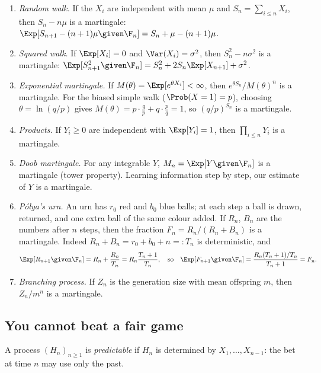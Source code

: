 \begin{example}\label{ex:martingales}
\begin{enumerate}[label=(\arabic*)]
\item \emph{Random walk.} If the $X_i$ are independent with mean $\mu$ and $S_n=\sum_{i\le n}X_i$,
then $S_n-n\mu$ is a martingale: $\Exp[S_{n+1}-(n+1)\mu\given\F_n]=S_n+\mu-(n+1)\mu$.
\item \emph{Squared walk.} If $\Exp[X_i]=0$ and $\Var(X_i)=\sigma^2$, then $S_n^2-n\sigma^2$
is a martingale: $\Exp[S_{n+1}^2\given\F_n]=S_n^2+2S_n\Exp[X_{n+1}]+\sigma^2$.
\item \emph{Exponential martingale.} If $M(\theta)=\Exp[e^{\theta X_i}]<\infty$, then
$e^{\theta S_n}/M(\theta)^n$ is a martingale. For the biased simple walk
($\Prob(X=1)=p$), choosing $\theta=\ln(q/p)$ gives $M(\theta)=p\cdot\frac qp+q\cdot\frac pq=1$,
so $(q/p)^{S_n}$ is a martingale.
\item \emph{Products.} If $Y_i\ge0$ are independent with $\Exp[Y_i]=1$, then
$\prod_{i\le n}Y_i$ is a martingale.
\item \emph{Doob martingale.} For any integrable $Y$, $M_n=\Exp[Y\given\F_n]$ is a martingale
(tower property). Learning information step by step, our estimate of $Y$ is a martingale.
\item \emph{P\'olya's urn.} An urn has $r_0$ red and $b_0$ blue balls; at each step a ball is
drawn, returned, and one extra ball of the same colour added. If $R_n$, $B_n$ are the
numbers after $n$ steps, then the fraction $F_n=R_n/(R_n+B_n)$ is a martingale. Indeed
$R_n+B_n=r_0+b_0+n=:T_n$ is deterministic, and
\[
\Exp[R_{n+1}\given\F_n]=R_n+\frac{R_n}{T_n}=R_n\frac{T_n+1}{T_n},\quad\text{so}\quad
\Exp[F_{n+1}\given\F_n]=\frac{R_n(T_n+1)/T_n}{T_n+1}=F_n.
\]
\item \emph{Branching process.} If $Z_n$ is the generation size with mean offspring $m$,
then $Z_n/m^n$ is a martingale.
\end{enumerate}
\end{example}

\subsection*{You cannot beat a fair game}

\begin{definition}
A process $(H_n)_{n\ge1}$ is \emph{predictable} if $H_n$ is determined by
$X_1,\dots,X_{n-1}$: the bet at time $n$ may use only the past.
\end{definition}

